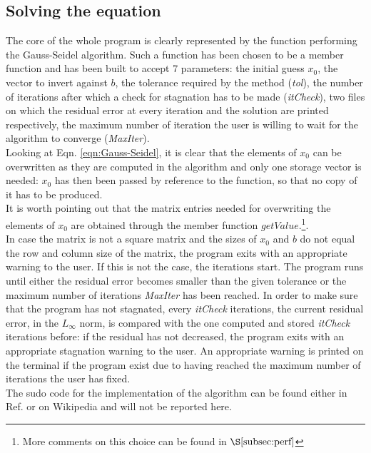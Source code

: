 \documentclass[11pt]{article}
\theoremstyle{theorem}
\theoremstyle{definition}
\begin{document}
\subsection{Solving the equation}
The core of the whole program is clearly represented by the function performing the Gauss-Seidel algorithm. Such a function has been chosen to be a member function and has been built to accept 7 parameters: the initial guess $x_0$, the vector to invert against $b$, the tolerance required by the method (\emph{tol}), the number of iterations after which a check for stagnation has to be made (\emph{itCheck}), two files on which the residual error at every iteration and the solution are printed respectively, the maximum number of iteration the user is willing to wait for the algorithm to converge (\emph{MaxIter}).\\
Looking at Eqn. \eqref{eqn:Gauss-Seidel}, it is clear that the elements of $x_0$ can be overwritten as they are computed in the algorithm and only one storage vector is needed: $x_0$ has then been passed by reference to the function, so that no copy of it has to be produced.\\
It is worth pointing out that the matrix entries needed for overwriting the elements of $x_0$ are obtained through the member function $getValue$.\footnote{More comments on this choice can be found in $\S\ref{subsec:perf}$}.\\  
In case the matrix is not a square matrix and the sizes of $x_0$ and $b$ do not equal the row and column size of the matrix, the program exits with an appropriate warning to the user. If this is not the case, the iterations start. The program runs until either the residual error becomes smaller than the given tolerance or the maximum number of iterations \emph{MaxIter} has been reached. In order to make sure that the program has not stagnated, every \emph{itCheck} iterations, the current residual error, in the $L_\infty$ norm, is compared with the one computed and stored \emph{itCheck} iterations before: if the residual has not decreased, the program exits with an appropriate stagnation warning to the user. An appropriate warning is printed on the terminal if the program exist due to having reached the maximum number of iterations the user has fixed.\\
The sudo code for the implementation of the algorithm can be found either in Ref.\cite{lec-notes} or on Wikipedia and will not be reported here. 
\end{document}
